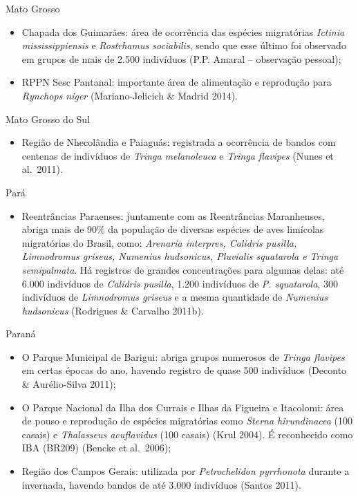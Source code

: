 \documentclass[
]{scrbook}
\providecommand{\tightlist}{%
  \setlength{\itemsep}{0pt}\setlength{\parskip}{0pt}}
\begin{document}
Mato Grosso

\begin{itemize}
\item
  Chapada dos Guimarães: área de ocorrência das espécies migratórias \emph{Ictinia mississippiensis} e \emph{Rostrhamus sociabilis}, sendo que esse último foi observado em grupos de mais de 2.500 indivíduos (P.P. Amaral -- observação pessoal);
\item
  RPPN Sesc Pantanal: importante área de alimentação e reprodução para \emph{Rynchops niger} (Mariano-Jelicich \& Madrid 2014).
\end{itemize}

Mato Grosso do Sul

\begin{itemize}
\tightlist
\item
  Região de Nhecolândia e Paiaguás: registrada a ocorrência de bandos com centenas de indivíduos de \emph{Tringa melanoleuca} e \emph{Tringa flavipes} (Nunes et al.~2011).
\end{itemize}

Pará

\begin{itemize}
\tightlist
\item
  Reentrâncias Paraenses: juntamente com as Reentrâncias Maranhenses, abriga mais de 90\% da população de diversas espécies de aves limícolas migratórias do Brasil, como: \emph{Arenaria interpres, Calidris pusilla, Limnodromus griseus, Numenius hudsonicus, Pluvialis squatarola e Tringa semipalmata}. Há registros de grandes concentrações para algumas delas: até 6.000 indivíduos de \emph{Calidris pusilla}, 1.200 indivíduos de \emph{P. squatarola}, 300 indivíduos de \emph{Limnodromus griseus} e a mesma quantidade de \emph{Numenius hudsonicus} (Rodrigues \& Carvalho 2011b).
\end{itemize}

Paraná

\begin{itemize}
\item
  O Parque Municipal de Barigui: abriga grupos numerosos de \emph{Tringa flavipes} em certas épocas do ano, havendo registro de quase 500 indivíduos (Deconto \& Aurélio-Silva 2011);
\item
  O Parque Nacional da Ilha dos Currais e Ilhas da Figueira e Itacolomi: área de pouso e reprodução de espécies migratórias como \emph{Sterna hirundinacea} (100 casais) e \emph{Thalasseus acuflavidus} (100 casais) (Krul 2004). É reconhecido como IBA (BR209) (Bencke et al.~2006);
\item
  Região dos Campos Gerais: utilizada por \emph{Petrochelidon pyrrhonota} durante a invernada, havendo bandos de até 3.000 indivíduos (Santos 2011).
\end{itemize}
\end{document}
